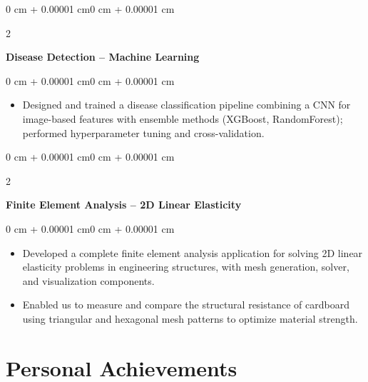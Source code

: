 \documentclass[10pt, letterpaper]{article}
\newenvironment{highlights}{
    \begin{itemize}[
        topsep=0.06 cm,
        parsep=0.06 cm,
        partopsep=0pt,
        itemsep=0pt,
        leftmargin=0 cm + 10pt
    ]
}{
    \end{itemize}
}
\newenvironment{onecolentry}{
    \begin{adjustwidth}{0 cm + 0.00001 cm}{0 cm + 0.00001 cm}
}{
    \end{adjustwidth}
}
\newenvironment{twocolentry}[2][]{
    \onecolentry
    \def\secondColumn{#2}
    \setcolumnwidth{\fill, 4.5 cm}
    \begin{paracol}{2}
}{
    \switchcolumn \raggedleft \secondColumn
    \end{paracol}
    \endonecolentry
}
\begin{document}
        \begin{twocolentry}{}
            \textbf{Disease Detection -- Machine Learning}
        \end{twocolentry}
        \vspace{0.06 cm}
        \begin{onecolentry}
            \begin{highlights}
                \item Designed and trained a disease classification pipeline combining a CNN for image-based features with ensemble methods (XGBoost, RandomForest); performed hyperparameter tuning and cross-validation. 
            \end{highlights}
        \end{onecolentry}

        \vspace{0.06 cm}

        \begin{twocolentry}{}
            \textbf{Finite Element Analysis -- 2D Linear Elasticity}
        \end{twocolentry}
        \vspace{0.06 cm}
        \begin{onecolentry}
            \begin{highlights}
                \item Developed a complete finite element analysis application for solving 2D linear elasticity problems in engineering structures, with mesh generation, solver, and visualization components.
                \item Enabled us to measure and compare the structural resistance of cardboard using triangular and hexagonal mesh patterns to optimize material strength.
            \end{highlights}
        \end{onecolentry}

    \section{Personal Achievements}
\end{document}
